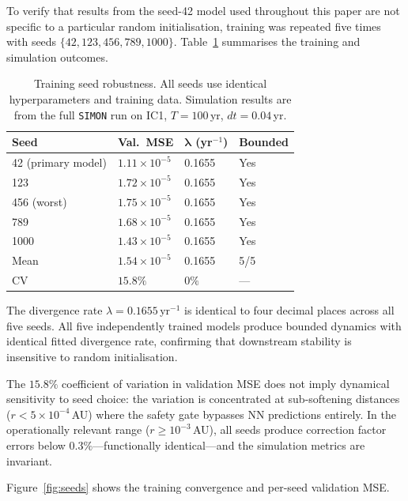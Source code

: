 \documentclass[12pt]{article}
\begin{document}
To verify that results from the seed-42 model used throughout this paper are
not specific to a particular random initialisation, training was repeated five times
with seeds $\{42, 123, 456, 789, 1000\}$. Table~\ref{tab:seeds} summarises the
training and simulation outcomes.

\begin{table}[H]
\centering
\caption{Training seed robustness. All seeds use identical hyperparameters and
training data. Simulation results are from the full \texttt{SIMON} run on IC1,
$T = 100$\,yr, $dt = 0.04$\,yr.}
\label{tab:seeds}
\begin{tabular}{@{}llll@{}}
\toprule
\textbf{Seed} & \textbf{Val.\ MSE} & $\boldsymbol{\lambda}$ (yr$^{-1}$) & \textbf{Bounded} \\
\midrule
42 (primary model) & $1.11\times10^{-5}$ & 0.1655 & Yes \\
123                & $1.72\times10^{-5}$ & 0.1655 & Yes \\
456 (worst)        & $1.75\times10^{-5}$ & 0.1655 & Yes \\
789                & $1.68\times10^{-5}$ & 0.1655 & Yes \\
1000               & $1.43\times10^{-5}$ & 0.1655 & Yes \\
\midrule
Mean               & $1.54\times10^{-5}$ & 0.1655 & 5/5 \\
CV                 & $15.8\%$            & $0\%$  & --- \\
\bottomrule
\end{tabular}
\end{table}

The divergence rate $\lambda = 0.1655$\,yr$^{-1}$ is identical to four decimal places across all five seeds. All five independently trained models produce bounded dynamics with identical fitted divergence rate, confirming that downstream stability is insensitive to random initialisation.

The $15.8\%$ coefficient of variation in validation MSE does not imply dynamical
sensitivity to seed choice: the variation is concentrated at sub-softening distances
($r < 5\times10^{-4}$\,AU) where the safety gate bypasses NN predictions entirely.
In the operationally relevant range ($r \geq 10^{-3}$\,AU), all seeds produce
correction factor errors below $0.3\%$---functionally identical---and the simulation
metrics are invariant.

Figure~\ref{fig:seeds} shows the training convergence and per-seed validation MSE.
\end{document}
